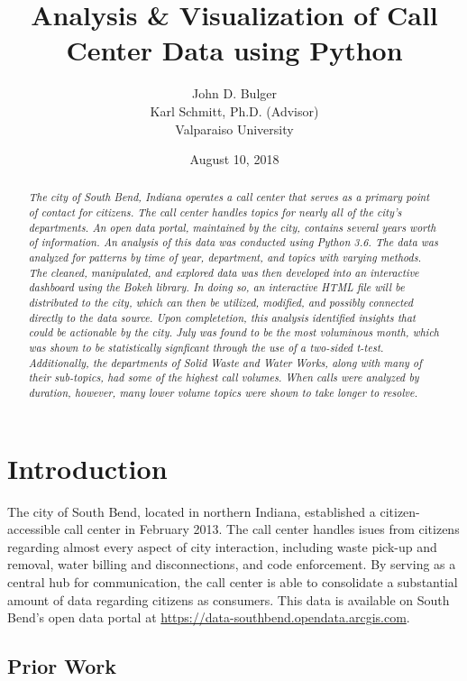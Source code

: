 \documentclass{article}
\title{Analysis \& Visualization of Call Center Data using Python}
\author{John D. Bulger
\\
Karl Schmitt, Ph.D. (Advisor)
\\
Valparaiso University\\
}
\date{August 10, 2018}
\begin{document}
\maketitle

\begin{abstract}
\textit{The city of South Bend, Indiana operates a call center that serves as a primary point of contact for citizens.  The call center handles topics for nearly all of the city's departments.  An open data portal, maintained by the city, contains several years worth of information.  An analysis of this data was conducted using Python 3.6.  The data was 
analyzed for patterns by time of year, department, and topics with varying methods.  The cleaned, manipulated, and explored data was then developed into an 
interactive dashboard using the Bokeh library.  In doing so, an interactive HTML file will be distributed to the city, which can then be utilized, modified, and possibly connected 
directly to the data source.  Upon completetion, this analysis identified insights that could be actionable by the city.  July was found to be the most voluminous month, which was shown to be statistically signficant through the use of a two-sided t-test.  Additionally, the departments of Solid Waste and Water Works, along with many of their sub-topics, had some of the highest call volumes.  When calls were analyzed by duration, however, many lower volume topics were shown to take longer to resolve.}
\end{abstract}

\section{Introduction}
The city of South Bend, located in northern Indiana, established a citizen-accessible call center in February 2013.  The call center handles isues from citizens regarding almost every aspect of city interaction, including waste pick-up and removal, water billing and disconnections, 
and code enforcement.  By serving as a central hub for communication, the call center is able to consolidate a substantial amount of data regarding citizens as consumers.  This data is available on South Bend's open data portal at \href{https://data-southbend.opendata.arcgis.com}{https://data-southbend.opendata.arcgis.com}.

	\subsection{Prior Work}
\end{document}
